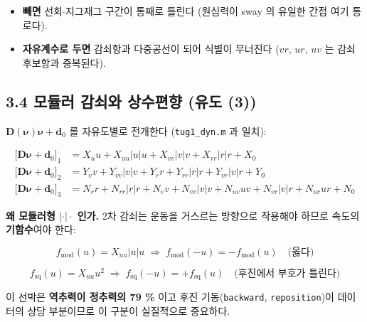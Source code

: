 \documentclass[10pt,a4paper]{article}
\begin{document}
\begin{itemize}[leftmargin=1.5em,itemsep=2pt,parsep=2pt,topsep=3pt]
\item \textbf{빼면} 선회$\cdot$지그재그 구간이 통째로 틀린다 (원심력이 sway 의 유일한 간접 여기 통로다).
\item \textbf{자유계수로 두면} 감쇠항과 다중공선이 되어 식별이 무너진다 ($vr$, $ur$, $uv$ 는 감쇠 후보항과 중복된다).
\end{itemize}

\subsection*{3.4 모듈러 감쇠와 상수편향 (유도 (3))}

$\mathbf{D}(\boldsymbol{\nu})\boldsymbol{\nu} + \mathbf{d}_0$ 를 자유도별로 전개한다 (\texttt{tug1\_dyn.m} 과 일치):

\begin{equation*}
\begin{aligned}
\big[\mathbf{D}\boldsymbol{\nu} + \mathbf{d}_0\big]_1 &=
X_u u + X_{uu}|u|u + X_{vv}|v|v + X_{rr}|r|r + X_0 \\[2pt]
\big[\mathbf{D}\boldsymbol{\nu} + \mathbf{d}_0\big]_2 &=
Y_v v + Y_{vv}|v|v + Y_r r + Y_{rr}|r|r + Y_{vr}|v|r + Y_0 \\[2pt]
\big[\mathbf{D}\boldsymbol{\nu} + \mathbf{d}_0\big]_3 &=
N_r r + N_{rr}|r|r + N_v v + N_{vv}|v|v + N_{uv}uv + N_{vr}|v|r + N_{ur}ur + N_0
\end{aligned} \tag{13}
\end{equation*}

\textbf{왜 모듈러형 $|\cdot|\cdot$ 인가.} 2차 감쇠는 운동을 거스르는 방향으로 작용해야 하므로 속도의 \textbf{기함수}여야 한다:

\begin{equation*}
f_{\text{mod}}(u) = X_{uu}|u|u \;\Rightarrow\; f_{\text{mod}}(-u) = -f_{\text{mod}}(u) \quad \text{(옳다)} 
\end{equation*}

\begin{equation*}
f_{\text{sq}}(u) = X_{uu}u^2 \;\Rightarrow\; f_{\text{sq}}(-u) = +f_{\text{sq}}(u) \quad \text{(후진에서 부호가 틀린다)} \tag{14}
\end{equation*}

이 선박은 \textbf{역추력이 정추력의 79 \%} 이고 후진 기동(\texttt{backward}, \texttt{reposition})이 데이터의 상당 부분이므로 이 구분이 실질적으로 중요하다.
\end{document}
